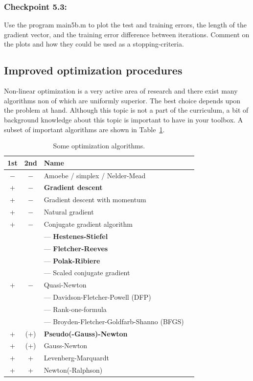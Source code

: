 \documentclass[12pt]{article}
\begin{document}
\subsubsection*{Checkpoint 5.3:}
 Use the program {\sf main5b.m} to plot the test and training errors,
 the length of the gradient vector, and the training error
 difference between iterations. Comment on the plots and how they could be used as a
 stopping-criteria.


\subsection*{Improved optimization procedures}

Non-linear optimization is a very active area of research and there exist many algorithms non of which are uniformly superior. The best choice depends upon the problem at hand. Although this topic is not a part of the curriculum, a bit of background knowledge about this topic is important to have in your toolbox.
A subset of important algorithms are shown in
Table~\ref{tab:optim}. 
%
\begin{table}[bh]
  \begin{center}
    \begin{tabular}{cclp{5cm}}
      \hline\hline
      1st & 2nd & Name \\ \hline
      $-$ & $-$ & Amoebe / simplex / Nelder-Mead \\
      + & $-$ & {\bf Gradient descent} \\
      + & $-$ & Gradient descent with momentum \\
      + & $-$ & Natural gradient  \\ \hline
      + & $-$ & Conjugate gradient algorithm & \\
      & & ---  {\bf Hestenes-Stiefel} \\
      & & ---  {\bf Fletcher-Reeves} \\
      & & ---  {\bf Polak-Ribiere} \\
      & & ---  Scaled conjugate gradient &  \\ \hline
      + & $-$ & Quasi-Newton  \\
      & & --- Davidson-Fletcher-Powell (DFP)  \\
      & & --- Rank-one-formula  \\
      & & --- Broyden-Fletcher-Goldfarb-Shanno (BFGS)  \\
      \hline
      + & (+) & {\bf Pseudo(-Gauss)-Newton} \\
      + & (+) & Gauss-Newton \\
      + & + & Levenberg-Marquardt \\
      + & + & Newton(-Ralphson)  \\
      \hline \hline
    \end{tabular}
    \caption{Some optimization algorithms.}
    \label{tab:optim}
  \end{center}
\end{table}
\end{document}
